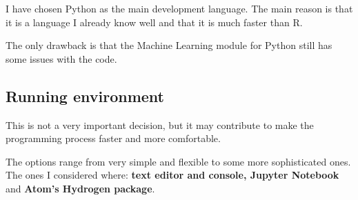 \documentclass{article}
\begin{document}
    I have chosen Python as the main development language. The main reason is
    that it is a language I already know well and that it is much faster than
    R.

    The only drawback is that the Machine Learning module for Python still
    has some issues with the code.
    \subsection{Running environment}

    This is not a very important decision, but it may contribute to make the
    programming process faster and more comfortable.

    The options range from very simple and flexible to some more sophisticated
    ones. The ones I considered where: \textbf{text editor and console, Jupyter
    Notebook} and \textbf{Atom's Hydrogen package}.
\end{document}
